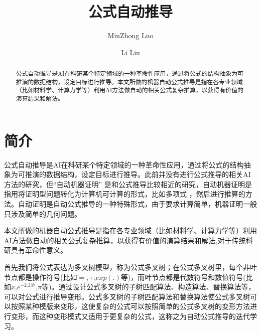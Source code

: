 \documentclass[runningheads]{llncs}
\begin{document}
%
\title{公式自动推导}
%
%
\author{MinZhong Luo \and
Li Liu}
%
%
%
\maketitle              %
%
\begin{abstract}
公式自动推导是AI在科研某个特定领域的一种革命性应用，通过将公式的结构抽象为可推演的数据结构，设定目标进行推导。本文所做的机器自动公式推导是指在各专业领域（比如材料学、计算力学等）利用AI方法做自动的相关公式复杂推算，以获得有价值的演算结果和解法。

\end{abstract}
%
%
%
\section{简介}
公式自动推导是AI在科研某个特定领域的一种革命性应用，通过将公式的结构抽象为可推演的数据结构，设定目标进行推导。此前并没有进行公式推导的相关AI方法的研究，但“自动机器证明”\cite{ref_article1} 是和公式推导比较相近的研究，自动机器证明是指用将证明型问题转化为计算机可计算的形式，比如多项式 \cite{ref_article1}，然后进行推算的方法。自动证明是自动公式推导的一种特殊形式，由于要求计算简单，机器证明一般只涉及简单的几何问题\cite{ref_article1}。

本文所做的机器自动公式推导是指在各专业领域（比如材料学、计算力学等）利用AI方法做自动的相关公式复杂推算，以获得有价值的演算结果和解法,对于传统科研具有革命性意义。

首先我们将公式表达为多叉树模型，称为公式多叉树；在公式多叉树里，每个非叶节点都是操作符号(比如$=$,$+$,$exp(.)$等)，而叶节点都是代数符号和数值符号(比如$x$,$e^{-2.337}$,$\pi$等)。通过设计公式多叉树的子树匹配算法、构造算法、替换算法等，可以对公式进行推导变形。公式多叉树的子树匹配算法和替换算法使公式多叉树可以按照某种模版来变形，这使复杂的公式可以按照简单的公式多叉树的变形方法进行变形，而这种变形模式又适用于更复杂的公式，这称之为自动公式推导的迭代学习。
\end{document}
